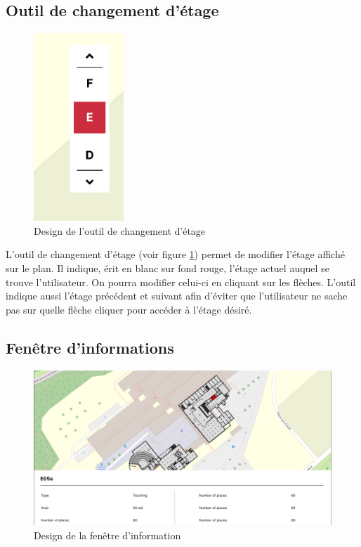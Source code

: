 \documentclass[
    iai, %
    il, %
]{heig-tb}
\begin{document}
\subsection{Outil de changement d'étage}

\begin{figure}[h]
    \centering
    \includegraphics[scale=1]{designChangementEtage.png}
    \caption{Design de l'outil de changement d'étage}
    \label{fig:floorChange}
\end{figure}

L'outil de changement d'étage (voir figure \ref{fig:floorChange}) permet de modifier l'étage affiché sur le plan.
Il indique, érit en blanc sur fond rouge, l'étage actuel auquel se trouve l'utilisateur.
On pourra modifier celui-ci en cliquant sur les flèches.
L'outil indique aussi l'étage précédent et suivant
afin d'éviter que l'utilisateur ne sache pas sur quelle flèche cliquer pour accéder à l'étage désiré.

\subsection{Fenêtre d'informations}

\begin{figure}[h]
    \centering
    \includegraphics[scale=0.4]{designInfo.png}
    \caption{Design de la fenêtre d'information}
    \label{fig:infoPanel}
\end{figure}
\end{document}
